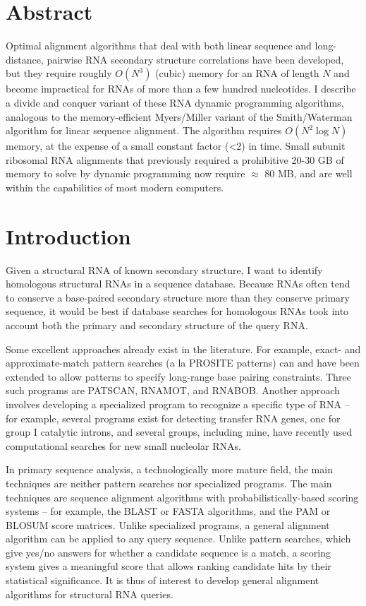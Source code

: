 \documentclass[11pt]{article}
\begin{document}
\section{Abstract}

Optimal alignment algorithms that deal with both linear sequence and
long-distance, pairwise RNA secondary structure correlations have been
developed, but they require roughly $O(N^3)$ (cubic) memory for an RNA
of length $N$ and become impractical for RNAs of more than a few
hundred nucleotides. I describe a divide and conquer variant of these
RNA dynamic programming algorithms, analogous to the memory-efficient
Myers/Miller variant of the Smith/Waterman algorithm for linear
sequence alignment. The algorithm requires $O(N^2 \log N)$ memory, at
the expense of a small constant factor (<2) in time. Small subunit
ribosomal RNA alignments that previously required a prohibitive 20-30
GB of memory to solve by dynamic programming now require $\approx$ 80
MB, and are well within the capabilities of most modern computers.

\section{Introduction}

Given a structural RNA of known secondary structure, I want to
identify homologous structural RNAs in a sequence database. Because
RNAs often tend to conserve a base-paired secondary structure more
than they conserve primary sequence, it would be best if database
searches for homologous RNAs took into account both the primary and
secondary structure of the query RNA.

Some excellent approaches already exist in the literature. For
example, exact- and approximate-match pattern searches (a la PROSITE
patterns) can and have been extended to allow patterns to specify
long-range base pairing constraints. Three such programs are PATSCAN,
RNAMOT, and RNABOB. Another approach involves developing a specialized
program to recognize a specific type of RNA -- for example, several
programs exist for detecting transfer RNA genes, one for group I
catalytic introns, and several groups, including mine, have recently
used computational searches for new small nucleolar RNAs.

In primary sequence analysis, a technologically more mature field, the
main techniques are neither pattern searches nor specialized
programs. The main techniques are sequence alignment algorithms with
probabilistically-based scoring systems -- for example, the BLAST or
FASTA algorithms, and the PAM or BLOSUM score matrices. Unlike
specialized programs, a general alignment algorithm can be applied to
any query sequence. Unlike pattern searches, which give yes/no answers
for whether a candidate sequence is a match, a scoring system gives a
meaningful score that allows ranking candidate hits by their
statistical significance. It is thus of interest to develop general
alignment algorithms for structural RNA queries.
\end{document}
